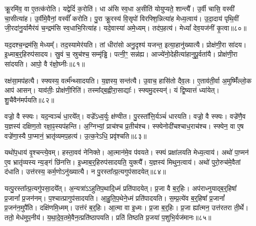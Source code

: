 क्रू॒रमि॑व॒ वा ए॒तत्क॑रोति।
यद्वेदिं॑ क॒रोति॑।
धा अ॑सि स्व॒धा अ॒सीति॑ योयुप्यते॒ शान्त्यै᳚।
उ॒र्वी चासि॒ वस्वी॑ चा॒सीत्या॑ह।
उ॒र्वीमे॒वैनां॒ वस्वीं᳚ करोति।
पु॒रा क्रू॒रस्य॑ वि॒सृपो॑ विरफ्शि॒न्नित्या॑ह मेध्य॒त्वाय॑।
उ॒दा॒दाय॑ पृथि॒वीं जी॒रदा॑नु॒र्यामैर॑यं च॒न्द्रम॑सि स्व॒धाभि॒रित्या॑ह।
यदे॒वास्या॑ अमे॒ध्यम्।
तद॑प॒हत्य॑।
मेध्यां᳚ देव॒यज॑नीं कृ॒त्वा॥८०॥\ip

यद॒दश्च॒न्द्रम॑सि॒ मेध्यम्᳚।
तद॒स्यामेर॑यति।
तां धीरा॑सो अनु॒दृश्य॑ यजन्त॒ इत्या॒हानु॑ख्यात्यै।
प्रोक्ष॑णी॒रा सा॑दय।
इ॒ध्माब॒र्॒\mbox{}हिरुप॑सादय।
स्रु॒वं च॒ स्रुच॑श्च॒ सम्मृ॑ड्ढि।
पत्नी॒ꣳ॒ सन्न॑ह्य।
आज्ये॑नो॒देहीत्या॑हानुपू॒र्वता॑यै।
प्रोक्ष॑णी॒रा सा॑दयति।
आपो॒ वै र॑क्षो॒घ्नीः॥८१॥\ip

रक्ष॑सा॒मप॑हत्यै।
स्फ्यस्य॒ वर्त्म᳚न्थ्सादयति।
य॒ज्ञस्य॒ सन्त॑त्यै।
उ॒वाच॒ हासि॑तो दैव॒लः।
ए॒ताव॑ती॒र्वा अ॒मुष्मिँ॑ल्लो॒क आप॑ आसन्।
याव॑तीः॒ प्रोक्ष॑णी॒रिति॑।
तस्मा᳚द्ब॒ह्वीरा॒साद्याः᳚।
स्फ्यमु॒दस्यन्॑।
यं द्वि॒ष्यात्तं ध्या॑येत्।
शु॒चैवैन॑मर्पयति॥८२॥\ip{}

वज्रो॒ वै स्फ्यः।
यद॒न्वञ्चं॑ धा॒रये᳚त्।
वज्रे᳚\-ऽध्व॒र्युः क्ष॑ण्वीत।
पु॒रस्ता᳚त्ति॒र्यञ्चं॑ धारयति।
वज्रो॒ वै स्फ्यः।
वज्रे॑णै॒व य॒ज्ञस्य॑ दक्षिण॒तो रक्षा॒ꣴ॒स्यप॑हन्ति।
अ॒ग्निभ्यां॒ प्राच॑श्च प्र॒तीच॑श्च।
स्फ्येनोदी॑चश्चाध॒राच॑श्च।
स्फ्येन॒ वा ए॒ष वज्रे॑णा॒स्यै पा॒प्मानं॒ भ्रातृ॑व्यमप॒हत्य॑।
उ॒त्क॒रेऽधि॒ प्रवृ॑श्चति॥८३॥\ip

यथो॑प॒धाय॑ वृ॒श्चन्त्ये॒वम्।
हस्ता॒वव॑ नेनिक्ते।
आ॒त्मान॑मे॒व प॑वयते।
स्फ्यं प्रक्षा॑लयति मेध्य॒त्वाय॑।
अथो॑ पा॒प्मन॑ ए॒व भ्रातृ॑व्यस्य न्य॒ङ्गं छि॑नत्ति।
इ॒ध्माब॒र्॒\mbox{}हिरुप॑सादयति॒ युक्त्यै᳚।
य॒ज्ञस्य॑ मिथुन॒त्वाय॑।
अथो॑ पुरो॒रुच॑मे॒वैतां द॑धाति।
उत्त॑रस्य॒ कर्म॒णो\-ऽनु॑ख्यात्यै।
न पु॒रस्ता᳚त्प्र॒त्यगुप॑सादयेत्॥८४॥\ip

यत्पु॒रस्ता᳚त्प्र॒त्यगु॑पसा॒दये᳚त्।
अ॒न्यत्रा॑ऽऽहुतिप॒थादि॒ध्मं प्रति॑\-पादयेत्।
प्र॒जा वै ब॒र्॒हिः।
अप॑राध्नुयाद्ब॒र्॒हिषा᳚ प्र॒जानां᳚ प्र॒जन॑नम्।
प॒श्चात्प्रागुप॑सादयति।
आ॒हु॒ति॒प॒थेने॒ध्मं प्रति॑\-पादयति।
स॒म्प्र॒त्ये॑व ब॒र्॒हिषा᳚ प्र॒जानां᳚ प्र॒जन॑न॒मुपै॑ति।
दक्षि॑णमि॒ध्मम्।
उत्त॑रं ब॒र्॒हिः।
आ॒त्मा वा इ॒ध्मः।
प्र॒जा ब॒र्॒हिः।
प्र॒जा ह्या᳚त्मन॒ उत्त॑रतरा ती॒र्थे।
ततो॒ मेध॑मुप॒नीय॑।
य॒था॒दे॒व॒तमे॒वैन॒त्प्रति॑\-ष्ठापयति।
प्रति॑ तिष्ठति प्र॒जया॑ प॒शुभि॒र्यज॑मानः॥८५॥\ip\anuvakamend[वृ॒श्च॒ति॒ सा॒द॒ये॒दि॒ध्मः पञ्च॑ च]


\clearpage
{}
\setcounter{anuvakam}{0}

